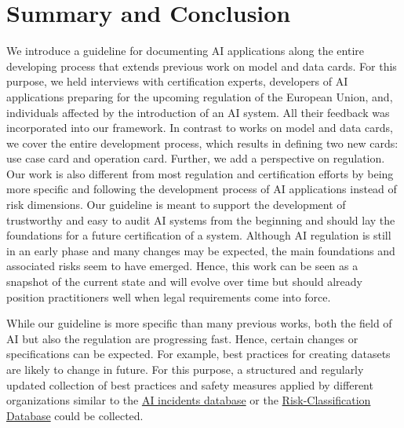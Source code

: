 \pagebreak

\section{Summary and Conclusion}
We introduce a guideline for documenting AI applications along the entire developing process that extends previous work on model and data cards. For this purpose, we held interviews with certification experts, developers of AI applications preparing for the upcoming regulation of the European Union, and, individuals affected by the introduction of an AI system. All their feedback was incorporated into our framework. 
In contrast to works on model and data cards, we cover the entire development process, which results in defining two new cards: use case card and operation card. Further, we add a perspective on regulation. Our work is also different from most regulation and certification efforts by being more specific and following the development process of AI applications instead of risk dimensions.  Our guideline is meant to support the development of trustworthy and easy to audit AI systems from the beginning and should lay the foundations for a future certification of a system. Although AI regulation is still in an early phase and many changes may be expected, the main foundations and associated risks seem to have emerged. Hence, this work can be seen as a snapshot of the current state and will evolve over time but should already position practitioners well when legal requirements come into force.

While our guideline is more specific than many previous works, both the field of AI but also the regulation are progressing fast. Hence, certain changes or specifications can be expected. For example, best practices for creating datasets are likely to change in future. For this purpose, a structured and regularly updated collection of best practices and safety measures applied by different organizations similar to the \href{https://incidentdatabase.ai/}{AI incidents database} or the \href{https://appliedaiinitiative.notion.site/Risk-Classification-Database-2b58830bb7f54c9d8c869d37bdb27709}{Risk-Classification Database} could be collected. 



